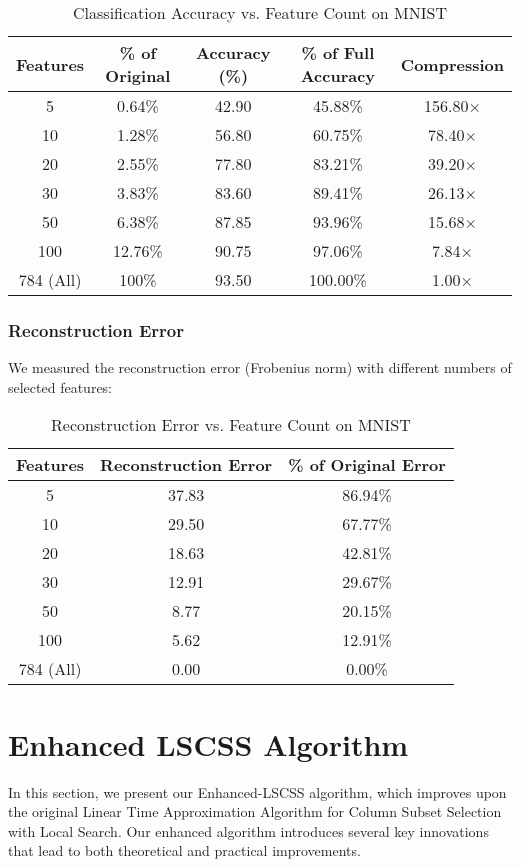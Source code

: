 \documentclass{article}
\begin{document}
\begin{table}[h]
\centering
\caption{Classification Accuracy vs. Feature Count on MNIST}
\begin{tabular}{ccccc}
\toprule
\textbf{Features} & \textbf{\% of Original} & \textbf{Accuracy (\%)} & \textbf{\% of Full Accuracy} & \textbf{Compression} \\
\midrule
5 & 0.64\% & 42.90 & 45.88\% & 156.80$\times$ \\
10 & 1.28\% & 56.80 & 60.75\% & 78.40$\times$ \\
20 & 2.55\% & 77.80 & 83.21\% & 39.20$\times$ \\
30 & 3.83\% & 83.60 & 89.41\% & 26.13$\times$ \\
50 & 6.38\% & 87.85 & 93.96\% & 15.68$\times$ \\
100 & 12.76\% & 90.75 & 97.06\% & 7.84$\times$ \\
\midrule
784 (All) & 100\% & 93.50 & 100.00\% & 1.00$\times$ \\
\bottomrule
\end{tabular}
\label{tab:accuracy_vs_features}
\end{table}

\subsubsection{Reconstruction Error}
We measured the reconstruction error (Frobenius norm) with different numbers of selected features:

\begin{table}[h]
\centering
\caption{Reconstruction Error vs. Feature Count on MNIST}
\begin{tabular}{ccc}
\toprule
\textbf{Features} & \textbf{Reconstruction Error} & \textbf{\% of Original Error} \\
\midrule
5 & 37.83 & 86.94\% \\
10 & 29.50 & 67.77\% \\
20 & 18.63 & 42.81\% \\
30 & 12.91 & 29.67\% \\
50 & 8.77 & 20.15\% \\
100 & 5.62 & 12.91\% \\
\midrule
784 (All) & 0.00 & 0.00\% \\
\bottomrule
\end{tabular}
\label{tab:reconstruction_error}
\end{table}



\section{Enhanced LSCSS Algorithm}
In this section, we present our Enhanced-LSCSS algorithm, which improves upon the original Linear Time Approximation Algorithm for Column Subset Selection with Local Search. Our enhanced algorithm introduces several key innovations that lead to both theoretical and practical improvements.
\end{document}
